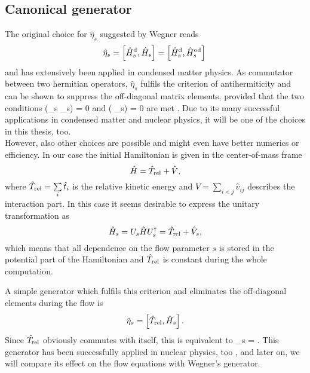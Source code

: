 \subsection{Canonical generator}
The original choice for $\hat{\eta}_s$ suggested by Wegner \cite{PhysRepWegner0} reads
\[
 \hat{\eta}_s = \left[\hat{H}^{\rm d}_s,\hat{H}_s\right] = \left[\hat{H}^{\rm d}_s,\hat{H}^{\rm od}_s\right] \,
\]
and has extensively been applied in condensed matter physics. As commutator between two hermitian operators, $\hat{\eta}_s$ fulfils the criterion of antihermiticity and can be shown to suppress the off-diagonal matrix elements, provided that the two conditions
\be
 \left(\Hd_s \Ho_s\right) = 0
\label{eq:cond1}
\ee
and
\be
{}\left( \Ho_s\right) = 0
\label{eq:cond2}
\ee
are met \cite{kehrein2006flow}. Due to its many successful applications in condensed matter and nuclear physics, it will be one of the choices in this thesis, too.\\
However, also other choices are possible and might even have better numerics or efficiency. In
our case the initial Hamiltonian is given in the center-of-mass frame
\[
\hat{H} = \hat{T}_{\rm rel} + \hat{V},
\]
where $\hat{T}_{\rm rel} = \sum\limits_i \hat{t}_i$  is the relative kinetic energy  and $\hat{V} = \sum\limits_{i<j} \hat{v}_{ij} $ describes the interaction part. In this case it seems desirable to express the unitary transformation as
\[
\hat{H}_s = U_s \hat{H} U^\dagger_s = \hat{T}_{\rm rel} + \hat{V}_s,
\]
which means that all dependence on the flow parameter $s$ is stored in the potential part of the Hamiltonian and $\hat{T}_{\rm rel}$ is constant during the whole computation.

A simple generator which fulfils this criterion and eliminates the off-diagonal elements during the flow is
\[
\hat{\eta}_s = \left[\hat{T}_{\rm rel}, \hat{H}_s\right].
\]
Since $\hat{T}_{\rm rel}$ obviously commutes with itself, this is equivalent to
\be
\hat{\eta}_s = .
\label{eq:eta_simple}
\ee
This generator has been successfully applied in nuclear physics, too \cite{ScottSRG,PhysRevC.75.061001,Bogner200821,SRGThreeDim},
and later on, we will compare its effect on the flow equations with Wegner's generator.

